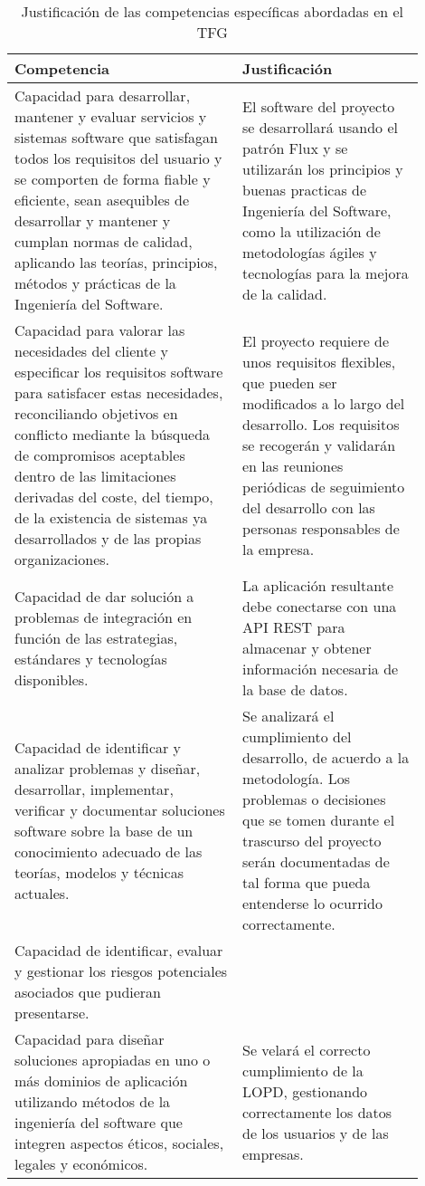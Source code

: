 \documentclass{pre-tfg}
\begin{document}
\clearpage


\begin{table}[hp]
  \centering
  \caption{Justificación de las competencias específicas abordadas en el TFG}
  \label{tab:competencias}

  \begin{tabular}{p{0.5\linewidth}p{0.4\linewidth}}
    \textbf{Competencia} & \textbf{Justificación} \\
    \hline
    Capacidad para desarrollar, mantener y evaluar servicios y sistemas software que satisfagan
    todos los requisitos del usuario y se comporten de forma fiable y eficiente, sean asequibles
    de desarrollar y mantener y cumplan normas de calidad, aplicando las teorías, principios,
    métodos y prácticas de la Ingeniería del Software.
    & El software del proyecto se desarrollará usando el patrón Flux y se utilizarán los principios
    y buenas practicas de Ingeniería del Software, como la utilización de metodologías ágiles y
    tecnologías para la mejora de la calidad.\\
    Capacidad para valorar las necesidades del cliente y especificar los requisitos software para
    satisfacer estas necesidades, reconciliando objetivos en conflicto mediante la búsqueda de
    compromisos aceptables dentro de las limitaciones derivadas del coste, del tiempo, de la existencia
    de sistemas ya desarrollados y de las propias organizaciones.
    & El proyecto requiere de unos requisitos flexibles, que pueden ser modificados a lo largo del
    desarrollo. Los requisitos se recogerán y validarán en las reuniones periódicas de seguimiento
    del desarrollo con las personas responsables de la empresa.\\
    Capacidad de dar solución a problemas de integración en función de las estrategias, estándares
    y tecnologías disponibles.
    & La aplicación resultante debe conectarse con una API REST para almacenar y obtener información
    necesaria de la base de datos.\\
    Capacidad de identificar y analizar problemas y diseñar, desarrollar, implementar, verificar y
    documentar soluciones software sobre la base de un conocimiento adecuado de las teorías, modelos
    y técnicas actuales.
    & Se analizará el cumplimiento del desarrollo, de acuerdo a la metodología. Los problemas o
    decisiones que se tomen durante el trascurso del proyecto serán documentadas de tal forma que
    pueda entenderse lo ocurrido correctamente. \\
    Capacidad de identificar, evaluar y gestionar los riesgos potenciales asociados que pudieran presentarse.
    & \\
    Capacidad para diseñar soluciones apropiadas en uno o más dominios de aplicación utilizando métodos
    de la ingeniería del software que integren aspectos éticos, sociales, legales y económicos.
    & Se velará el correcto cumplimiento de la LOPD, gestionando correctamente los datos de los
    usuarios y de las empresas.\\
    \hline
  \end{tabular}
\end{table}
\end{document}
